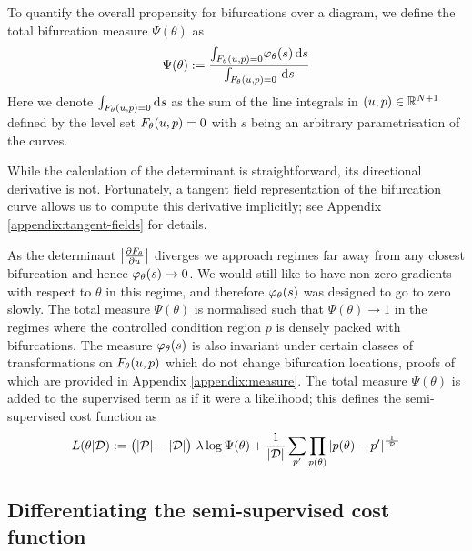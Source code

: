 To quantify the overall propensity for bifurcations over a diagram, we define the total bifurcation measure $\Psi(\theta)$ as
\begin{equation}
    \Psi(\theta):=\frac{
        \int_{F_{\theta}(u,p)=0}\!
        \varphi_{\theta}(s)\,\mathrm{d}s
    }{
        \int_{F_{\theta}(u,p)=0}\!\
        \mathrm{d}s
    }
\end{equation}
Here we denote $\int_{F_{\theta}(u,p)=0}\mathrm{d}s$ as the sum of the line integrals in $(u,p)\in\mathbb{R}^{N+1}$ defined by the level set $F_{\theta}(u,p)=0$ with $s$ being an arbitrary parametrisation of the curves.

While the calculation of the determinant is straightforward, its directional derivative is not. Fortunately, a tangent field representation of the bifurcation curve allows us to compute this derivative implicitly; see Appendix \ref{appendix:tangent-fields} for details.

As the determinant $\left| \frac{\partial F_{\theta}}{\partial u} \right|$ diverges we approach regimes far away from any closest bifurcation and hence $\varphi_{\theta}(s)\rightarrow0$. We would still like to have non-zero gradients with respect to $\theta$ in this regime, and therefore $\varphi_{\theta}(s)$ was designed to go to zero slowly. The total measure $\Psi(\theta)$ is normalised such that $\Psi(\theta)\rightarrow1$ in the regimes where the controlled condition region $p$ is densely packed with bifurcations. The measure $\varphi_{\theta}(s)$ is also invariant under certain classes of transformations on $F_{\theta}(u,p)$ which do not change bifurcation locations, proofs of which are provided in Appendix \ref{appendix:measure}. The total measure $\Psi(\theta)$ is added to the supervised term as if it were a likelihood; this defines the semi-supervised cost function as
\begin{align}
    L(\theta|\mathcal{D}):=
    \big(|\mathcal{P}|-|\mathcal{D}|\big)\,\,\lambda \log\Psi(\theta)+
    \frac{1}{|\mathcal{D}|}\sum_{p'}
    \prod_{p(\theta)}|p(\theta)-p'|
    ^{\frac{1}{|\mathcal{P}|}}
    \label{eq:loss}
\end{align}

\subsection{Differentiating the semi-supervised cost function}

